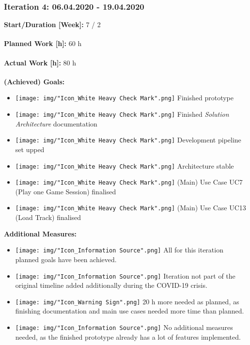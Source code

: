 			\subsubsection{Iteration 4: 06.04.2020 - 19.04.2020}
				\textbf{Start/Duration [Week]:} 7 / 2 \\~\\
				\textbf{Planned Work [h]:} 60 h \\~\\
				\textbf{Actual Work [h]:} 80 h \\~\\
				\textbf{(Achieved) Goals:}
				\begin{itemize}
					\item \texttt{[image: img/"Icon\_White Heavy Check Mark".png]} Finished prototype
					\item \texttt{[image: img/"Icon\_White Heavy Check Mark".png]} Finished \textit{Solution Architecture} documentation
					\item \texttt{[image: img/"Icon\_White Heavy Check Mark".png]} Development pipeline set upped
					\item \texttt{[image: img/"Icon\_White Heavy Check Mark".png]} Architecture stable
					\item \texttt{[image: img/"Icon\_White Heavy Check Mark".png]} (Main) Use Case UC7 (Play one Game Session) finalised
					\item \texttt{[image: img/"Icon\_White Heavy Check Mark".png]} (Main) Use Case UC13 (Load Track) finalised
				\end{itemize}
				\textbf{Additional Measures:}
				\begin{itemize}
					\item \texttt{[image: img/"Icon\_Information Source".png]} All for this iteration planned goals have been achieved.
					\item \texttt{[image: img/"Icon\_Information Source".png]} Iteration not part of the original timeline added additionally during the COVID-19 crisis.
					\item \texttt{[image: img/"Icon\_Warning Sign".png]} 20 h more needed as planned, as finishing documentation and main use cases needed more time than planned.
					\item \texttt{[image: img/"Icon\_Information Source".png]} No additional measures needed, as the finished prototype already has a lot of features implemented.
				\end{itemize}

